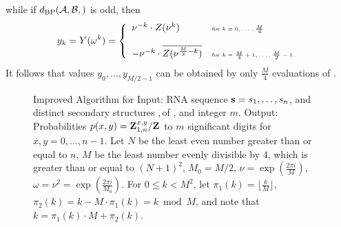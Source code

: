 while if $\dBP{\strA,\strB}$ is odd, then
\begin{align}
\label{eq:trickyRootsOfUnity2}
y_k = Y(\omega^k) = \left\{
\begin{array}{ll}
\nu^{-k} \cdot Z(\nu^k) &\mbox{\tiny for $k=0,\dots,\frac{M}{4}$}\\
\quad & \quad\\
-\nu^{-k} \cdot \overline{Z(\nu^{\frac{M}{2}-k})} &\mbox{\tiny for $k=\frac{M}{4}+1,\dots,\frac{M}{2}-1$.}\\
\end{array} \right.
\end{align}
It follows that values $y_0,\dots,y_{M/2-1}$ can be obtained by only
$\frac{M}{4}$ evaluations of \emZ{}.

\begin{figure}[!h]
\begin{small}
{\sc Improved Algorithm} for \ffttwo\hfill\break
{\sc Input:} RNA sequence ${\bf s}=s_1,\dots,s_n$, and distinct secondary
structures \strA,\,\strB of \seq, and integer $m$. \hfill\break
{\sc Output:} Probabilities $p(x,y)={\bf Z}^{x,y}_{1,n}/{\bf Z}^{}_{}$
to $m$ significant digits for $x,y=0,\dots,n-1$.
Let $N$ be the least even number greater than or equal
to $n$, $M$ be the least number evenly divisible by $4$, which is greater than
or equal to $(N+1)^2$, $M_0=M/2$, $\nu = \exp(\frac{2\pi i}{M})$,
$\omega=\nu^2= \exp(\frac{2\pi i}{M_0})$. For $0 \leq k < M^2$, let
$\pi_1(k) = \lfloor \frac{k}{M} \rfloor$,
$\pi_2(k) = k - M \cdot \pi_1(k) = k \bmod M$, and note that
$k=\pi_1(k)\cdot M + \pi_2(k)$.
\end{small}
\hfill\break
\smallskip
\begin{small}

\end{small}
\end{figure}
